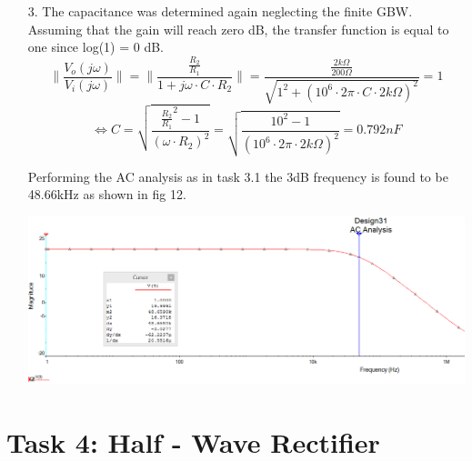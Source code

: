 \documentclass[11pt,a4paper]{article}
\begin{document}
\begin{enumerate}
\begin{minipage}{\linewidth}
    \end{minipage} 
    \pagebreak
  \item[3.]
  The capacitance was determined again neglecting the finite GBW. Assuming that the gain will reach zero dB, the transfer function is equal to one since log(1) = 0 dB. 
  $$\| \frac{V_o(j\omega)}{V_i(j\omega)} \| = \| \frac{\frac{R_2}{R_1}}{1+j\omega \cdot C \cdot R_2} \| = \frac{\frac{2k\Omega}{200\Omega}}{\sqrt{1^2+(10^6 \cdot 2\pi \cdot C \cdot 2k\Omega)^2}} = 1$$
  $$\Leftrightarrow C = \sqrt{\frac{\frac{R_2}{R_1}^2-1}{(\omega \cdot R_2)^2}}  = \sqrt{\frac{10^2-1}{(10^6 \cdot 2\pi \cdot 2k\Omega)^2}} = 0.792nF$$
  
Performing the AC analysis as in task 3.1 the 3dB frequency is found to be 48.66kHz as shown in fig 12.\\
\begin{minipage}{\linewidth}
    	\centering       
        \includegraphics[width=14cm]{Task3_3.png}
    \end{minipage}
\end{enumerate}
\pagebreak
\section*{Task 4: Half - Wave Rectifier}
\end{document}
